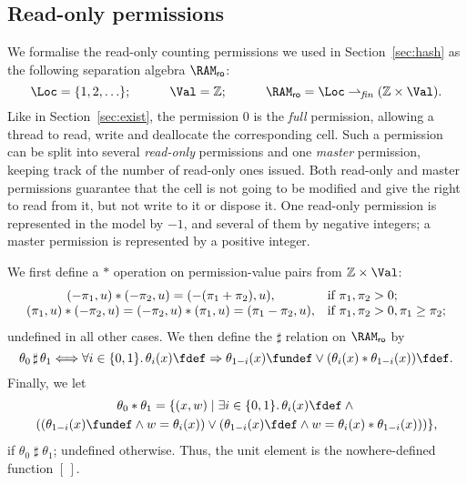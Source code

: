 \subsection{Read-only permissions}

We formalise the read-only counting permissions we used in
Section~\ref{sec:hash} as the following separation algebra $\RAM_{\sf ro}$:
$$
\Loc = \{1, 2, \ldots\};
\qquad\quad
\Val = \mathbb{Z};
\qquad\quad
\RAM_{\sf ro} = \Loc \rightharpoonup_{\it fin} (\mathbb{Z} \times \Val).
$$
Like in Section~\ref{sec:exist}, the permission $0$ is the {\em full}
permission, allowing a thread to read, write and deallocate the corresponding
cell. Such a permission can be split into several {\em read-only} permissions
and one {\em master} permission, keeping track of the number of read-only ones
issued. Both read-only and master permissions guarantee that the cell is not
going to be modified and give the right to read from it, but not write to it or
dispose it. One read-only permission is represented in the model by $-1$, and
several of them by negative integers; a master permission is represented by a
positive integer.

We first define a $*$ operation on permission-value
pairs from $\mathbb{Z} \times \Val$:
$$
\begin{array}{c@{\quad}l}
(-\pi_1, u) * (-\pi_2, u) = (-(\pi_1+\pi_2), u), & \mbox{if } \pi_1,\pi_2>0;
\\
(\pi_1, u) * (-\pi_2, u) = (-\pi_2, u) * (\pi_1, u) = (\pi_1-\pi_2, u),&
\mbox{if } \pi_1,\pi_2>0, \pi_1 \ge \pi_2;
\end{array}
$$
undefined in all other cases. We then define the $\sharp$ relation on
$\RAM_{\sf ro}$ by
$$
\theta_0 \mathop{\sharp} \theta_1 \Longleftrightarrow
\forall i \in \{0, 1\}.\, {\theta_i(x) \fdef} \Rightarrow 
{\theta_{1-i}(x) \fundef} \vee {(\theta_i(x) * \theta_{1-i}(x)) \fdef}.
$$
Finally, we let
\begin{multline*}
\theta_0 * \theta_1 = \{(x, w) \mid 
\exists i \in \{0, 1\}.\, {\theta_i(x) \fdef} \wedge{}\\
(({\theta_{1-i}(x) \fundef} \wedge w = \theta_i(x)) \vee 
({\theta_{1-i}(x) \fdef} \wedge w = \theta_i(x) * \theta_{1-i}(x)))
\},
\end{multline*}
if $\theta_0 \mathrel{\sharp} \theta_1$; undefined otherwise. Thus, the unit
element is the nowhere-defined function $[\,]$.

